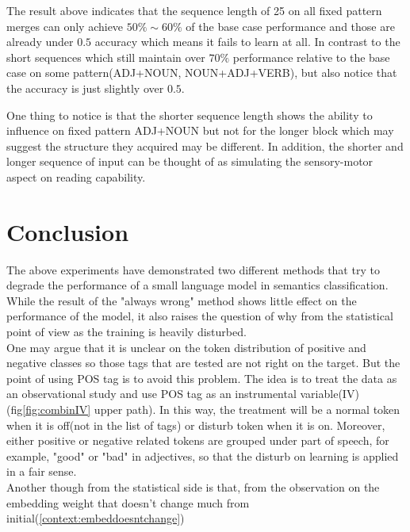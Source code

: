 \documentclass[12pt]{article}
\begin{document}
The result above indicates that the sequence length of 25 on all fixed pattern merges can only achieve $50\%\sim60\%$ of the base case performance and those are already under $0.5$ accuracy which means it fails to learn at all. In contrast to the short sequences which still maintain over $70\%$ performance relative to the base case on some pattern(ADJ+NOUN, NOUN+ADJ+VERB), but also notice that the accuracy is just slightly over $0.5$.

One thing to notice is that the shorter sequence length shows the ability to influence on fixed pattern ADJ+NOUN but not for the longer block which may suggest the structure they acquired may be different. In addition, the shorter and longer sequence of input can be thought of as simulating the sensory-motor aspect\cite{Hauser_2002} on reading capability. 


\clearpage
\section{Conclusion}

The above experiments have demonstrated two different methods that try to degrade the performance of a small language model in semantics classification. While the result of the "always wrong" method shows little effect on the performance of the model, it also raises the question of why from the statistical point of view as the training is heavily disturbed. \\

One may argue that it is unclear on the token distribution of positive and negative classes so those tags that are tested are not right on the target. But the point of using POS tag is to avoid this problem. The idea is to treat the data as an observational study and use POS tag as an instrumental variable(IV) (fig\ref{fig:combinIV} upper path). In this way, the treatment will be a normal token when it is off(not in the list of tags) or disturb token when it is on. Moreover, either positive or negative related tokens are grouped under part of speech, for example, "good" or "bad" in adjectives, so that the disturb on learning is applied in a fair sense. \\

Another though from the statistical side is that, from the observation on the embedding weight that doesn't change much from initial(\ref{context:embeddoesntchange})
\end{document}
